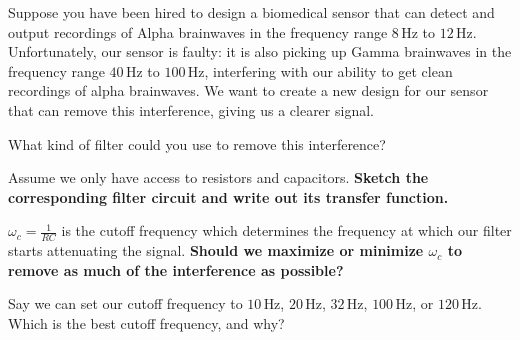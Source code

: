 

Suppose you have been hired to design a biomedical sensor that can detect and output recordings of Alpha brainwaves in the frequency range $8 \, \text{Hz}$ to $12 \, \text{Hz}$.
Unfortunately, our sensor is faulty: it is also picking up Gamma brainwaves in the frequency range $40 \, \text{Hz}$ to $100 \, \text{Hz}$, interfering with our ability to get clean recordings of alpha brainwaves.
We want to create a new design for our sensor that can remove this interference, giving us a clearer signal.

\begin{enumerate}
  \qitem What kind of filter could you use to remove this interference?


  \qitem Assume we only have access to resistors and capacitors. \textbf{Sketch the corresponding filter circuit and write out its transfer function.}


  \qitem $\omega_{c} = \frac{1}{RC}$ is the cutoff frequency which determines the frequency at which our filter starts attenuating the signal. \textbf{Should we maximize or minimize $\omega_{c}$ to remove as much of the interference as possible?}


  \qitem Say we can set our cutoff frequency to $10 \, \text{Hz}$, $20 \, \text{Hz}$, $32 \, \text{Hz}$, $100 \, \text{Hz}$, or $120 \, \text{Hz}$. Which is the best cutoff frequency, and why?



\end{enumerate}
